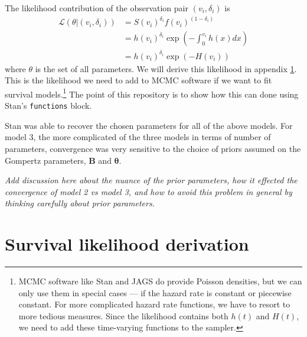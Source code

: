 \documentclass[12pt]{article}
\renewcommand{\vec}{\boldsymbol}
\begin{document}
The likelihood contribution of the observation pair $(v_i, \delta_i)$ is
\begin{align*}
\mathcal{L}\left(\theta |(v_i,\delta_i) \right)
&= S(v_i)^{\delta_i} f(v_i)^{(1-\delta_i)} \\
&= h(v_i)^{\delta_i} \exp{\left( - \int_0^{v_i}{h(x)dx} \right)} \\
&= h(v_i)^{\delta_i} \exp{\left( - H(v_i) \right)}
\end{align*}
where $\theta$ is the set of all parameters.
We will derive this likelihood in appendix \ref{ap:derivation}.
This is the likelihood we need to add to MCMC software if we want to fit survival models.\footnote{MCMC software like Stan and JAGS do provide Poisson densities, but we can only use them in special cases --- if the hazard rate is constant or piecewise constant.
For more complicated hazard rate functions, we have to resort to more tedious measures.
Since the likelihood contains both $h(t)$ and $H(t)$, we need to add these time-varying functions to the sampler.}
The point of this repository is to show how this can done using Stan's \texttt{functions} block.

Stan was able to recover the chosen parameters for all of the above
models. For model 3, the more complicated of the three models in terms
of number of parameters, convergence was very sensitive to the choice of
priors assumed on the Gompertz parameters, $\vec{B}$ and
$\vec{\theta}$.

\emph{Add discussion here about the nuance of the prior parameters, how
it effected the convergence of model 2 vs model 3, and how to avoid this
problem in general by thinking carefully about prior parameters.}


\appendix

\section{Survival likelihood derivation}
\label{ap:derivation}
\end{document}

